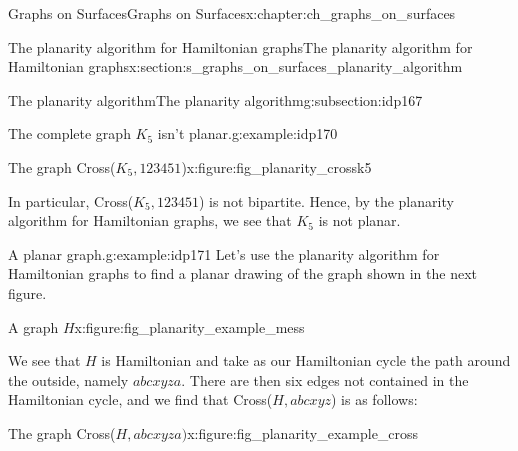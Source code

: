 \documentclass[oneside,10pt,]{book}
\numberwithin{equation}{section}
\begin{document}
\begin{chapterptx}{Graphs on Surfaces}{}{Graphs on Surfaces}{}{}{x:chapter:ch_graphs_on_surfaces}
\begin{sectionptx}{The planarity algorithm for Hamiltonian graphs}{}{The planarity algorithm for Hamiltonian graphs}{}{}{x:section:s_graphs_on_surfaces_planarity_algorithm}
\begin{subsectionptx}{The planarity algorithm}{}{The planarity algorithm}{}{}{g:subsection:idp167}
\begin{example}{The complete graph \(K_5\) isn't planar.}{g:example:idp170}
\begin{figureptx}{The graph Cross(\(K_5, 123451\))}{x:figure:fig_planarity_crossk5}{}
\begin{image}{0.15}{0.7}{0.15}
{\begin{tikzpicture}[scale=.7]
\end{tikzpicture}
}%
\end{image}%
\tcblower
\end{figureptx}%
In particular, Cross(\(K_5, 123451\)) is not bipartite.  Hence, by the planarity algorithm for Hamiltonian graphs, we see that \(K_5\) is not planar.%
\end{example}
\begin{example}{A planar graph.}{g:example:idp171}%
Let's use the planarity algorithm for Hamiltonian graphs to find a planar drawing of the graph shown in the next figure.%
\begin{figureptx}{A graph \(H\)}{x:figure:fig_planarity_example_mess}{}%
\begin{image}{0.15}{0.7}{0.15}%
%
\end{image}%
\tcblower
\end{figureptx}%
We see that \(H\) is Hamiltonian and take as our Hamiltonian cycle the path around the outside, namely \(abcxyza\).  There are then six edges not contained in the Hamiltonian cycle, and we find that Cross(\(H, abcxyz\)) is as follows:%
\begin{figureptx}{The graph Cross(\(H, abcxyza)\)}{x:figure:fig_planarity_example_cross}{}%
\begin{image}{0.15}{0.7}{0.15}%
\end{image}
\end{figureptx}
\end{example}
\end{subsectionptx}
\end{sectionptx}
\end{chapterptx}
\end{document}
